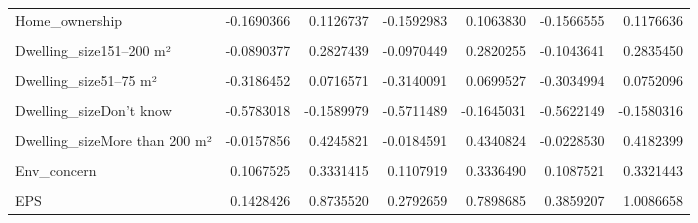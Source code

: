 \begin{table}
\begin{tabular}[t]{lrrrrrr}
Home\_ownership & -0.1690366 & 0.1126737 & -0.1592983 & 0.1063830 & -0.1566555 & 0.1176636\\
\cellcolor{gray!10}{Dwelling\_house} & \cellcolor{gray!10}{-0.1159786} & \cellcolor{gray!10}{0.1589194} & \cellcolor{gray!10}{-0.1188799} & \cellcolor{gray!10}{0.1579944} & \cellcolor{gray!10}{-0.1221248} & \cellcolor{gray!10}{0.1654435}\\
Dwelling\_size151–200 m² & -0.0890377 & 0.2827439 & -0.0970449 & 0.2820255 & -0.1043641 & 0.2835450\\
\cellcolor{gray!10}{Dwelling\_size26–50 m²} & \cellcolor{gray!10}{-0.3326744} & \cellcolor{gray!10}{0.1477517} & \cellcolor{gray!10}{-0.3425998} & \cellcolor{gray!10}{0.1479714} & \cellcolor{gray!10}{-0.3403525} & \cellcolor{gray!10}{0.1441778}\\
\addlinespace
Dwelling\_size51–75 m² & -0.3186452 & 0.0716571 & -0.3140091 & 0.0699527 & -0.3034994 & 0.0752096\\
\cellcolor{gray!10}{Dwelling\_size76–100 m²} & \cellcolor{gray!10}{-0.3700201} & \cellcolor{gray!10}{-0.0345408} & \cellcolor{gray!10}{-0.3677315} & \cellcolor{gray!10}{-0.0340487} & \cellcolor{gray!10}{-0.3493059} & \cellcolor{gray!10}{-0.0207971}\\
Dwelling\_sizeDon't know & -0.5783018 & -0.1589979 & -0.5711489 & -0.1645031 & -0.5622149 & -0.1580316\\
\cellcolor{gray!10}{Dwelling\_sizeLess than 25 m²} & \cellcolor{gray!10}{-0.9012768} & \cellcolor{gray!10}{0.0544502} & \cellcolor{gray!10}{-0.9053342} & \cellcolor{gray!10}{0.0335326} & \cellcolor{gray!10}{-0.9204023} & \cellcolor{gray!10}{0.0317737}\\
Dwelling\_sizeMore than 200 m² & -0.0157856 & 0.4245821 & -0.0184591 & 0.4340824 & -0.0228530 & 0.4182399\\
\addlinespace
\cellcolor{gray!10}{Rural} & \cellcolor{gray!10}{-0.0107837} & \cellcolor{gray!10}{0.2273565} & \cellcolor{gray!10}{-0.0117896} & \cellcolor{gray!10}{0.2249499} & \cellcolor{gray!10}{-0.0079773} & \cellcolor{gray!10}{0.2313706}\\
Env\_concern & 0.1067525 & 0.3331415 & 0.1107919 & 0.3336490 & 0.1087521 & 0.3321443\\
\cellcolor{gray!10}{Gov\_support} & \cellcolor{gray!10}{7.0258749} & \cellcolor{gray!10}{17.9350051} & \cellcolor{gray!10}{6.9705522} & \cellcolor{gray!10}{17.1949632} & \cellcolor{gray!10}{7.0969456} & \cellcolor{gray!10}{17.5282709}\\
EPS & 0.1428426 & 0.8735520 & 0.2792659 & 0.7898685 & 0.3859207 & 1.0086658\\

\end{tabular}
\end{table}
